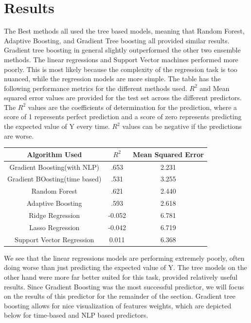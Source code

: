 \documentclass[12pt]{article}
\theoremstyle{definition}
\theoremstyle{remark}
\begin{document}
\section{Results}

The Best methods all used the tree based models, meaning that Random Forest, Adaptive Boosting, and Gradient Tree boosting all provided similar results. Gradient tree boosting in general slightly outperformed the other two ensemble methods. The linear regressions and Support Vector machines performed more poorly. This is most likely because the complexity of the regression task is too nuanced, while the regression models are more simple. The table has the following performance metrics for the different methods used. $R^2$ and Mean squared error values are provided for the test set across the different predictors.  The $R^2$ values are the coefficients of determination for the prediction, where a score of 1 represents perfect prediction and a score of zero represents predicting the expected value of Y every time. $R^2$ values can be negative if the predictions are worse. 



\begin{center}
\begin{tabular}{ |c|c|c| } 
 \hline
 Algorithm Used & $R^2$ & Mean Squared Error \\ 
 \hline
 \hline
 Gradient Boosting(with NLP) & .653 & 2.231 \\ 
 \hline
 Gradient BOosting(time based) & .531 & 3.255 \\ 
 \hline
 Random Forest & .621 & 2.440\\
 \hline 
 Adaptive Boosting  & .593 & 2.618\\
 \hline
 Ridge Regression & -0.052 & 6.781 \\
 \hline
 Lasso Regression & -0.042 & 6.719 \\
 \hline
 Support Vector Regression & 0.011 & 6.368\\
 \hline
\end{tabular}
\end{center}

We see that the linear regressions models are performing extremely poorly, often doing worse than just predicting the expected value of Y. The tree models on the other hand were more far better suited for this task, provided relatively useful results. Since Gradient Boosting was the most successful predictor, we will focus on the results of this predictor for the remainder of the section. Gradient tree boosting allows for nice visualization of features weights, which are depicted below for time-based and NLP based predictors. 
\end{document}
